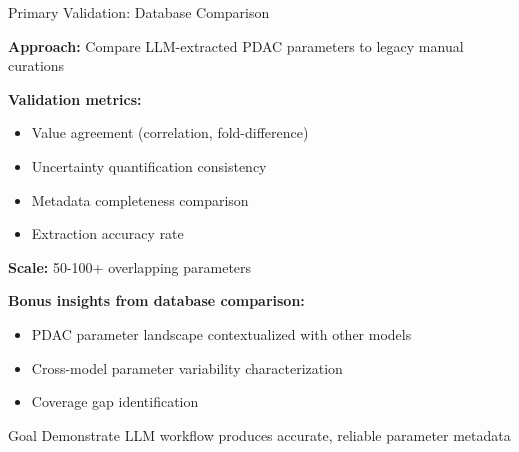 \documentclass[10pt]{beamer}
\begin{document}
\begin{frame}{Primary Validation: Database Comparison}

  \textbf{Approach:} Compare LLM-extracted PDAC parameters to legacy manual curations

  \vspace{0.3cm}

  \textbf{Validation metrics:}
  \begin{itemize}
    \item Value agreement (correlation, fold-difference)
    \item Uncertainty quantification consistency
    \item Metadata completeness comparison
    \item Extraction accuracy rate
  \end{itemize}

  \vspace{0.3cm}

  \textbf{Scale:} 50-100+ overlapping parameters

  \vspace{0.3cm}

  \textbf{Bonus insights from database comparison:}
  \begin{itemize}
    \item PDAC parameter landscape contextualized with other models
    \item Cross-model parameter variability characterization
    \item Coverage gap identification
  \end{itemize}

  \vspace{0.2cm}

  \begin{alertblock}{Goal}
    Demonstrate LLM workflow produces accurate, reliable parameter metadata
  \end{alertblock}

\end{frame}
\end{document}
